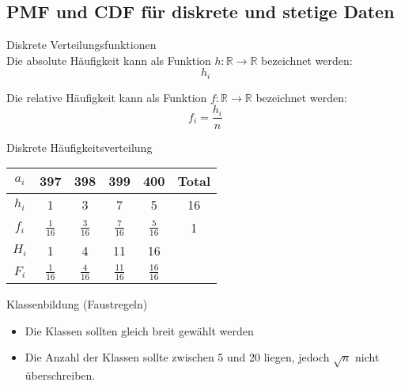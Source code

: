 \subsection{PMF und CDF für diskrete und stetige Daten}

\begin{definition}{Diskrete Verteilungsfunktionen}\\
Die absolute Häufigkeit kann als Funktion $h: \mathbb{R} \rightarrow \mathbb{R}$ bezeichnet werden:
$$h_i$$

Die relative Häufigkeit kann als Funktion $f: \mathbb{R} \rightarrow \mathbb{R}$ bezeichnet werden:
$$f_i = \frac{h_i}{n}$$

\begin{example}{Diskrete Häufigkeitsverteilung}\\
\renewcommand{\arraystretch}{2}%
\begin{center}
\begin{tabular}{|c|c|c|c|c|c|}
\hline
$a_i$ & 397 & 398 & 399 & 400 & Total \\
\hline
$h_i$ & 1 & 3 & 7 & 5 & 16 \\
\hline
$f_i$ & $\frac{1}{16}$ & $\frac{3}{16}$ & $\frac{7}{16}$ & $\frac{5}{16}$ & 1 \\
\hline
$H_i$ & 1 & 4 & 11 & 16 & \\
\hline
$F_i$ & $\frac{1}{16}$ & $\frac{4}{16}$ & $\frac{11}{16}$ & $\frac{16}{16}$ & \\
\hline
\end{tabular}
\end{center}
\end{example}
\end{definition}

\begin{concept}{Klassenbildung (Faustregeln)}\\
\begin{itemize}
  \item Die Klassen sollten gleich breit gewählt werden
  \item Die Anzahl der Klassen sollte zwischen 5 und 20 liegen, jedoch $\sqrt{n}$ nicht überschreiben.
\end{itemize}
\end{concept}

